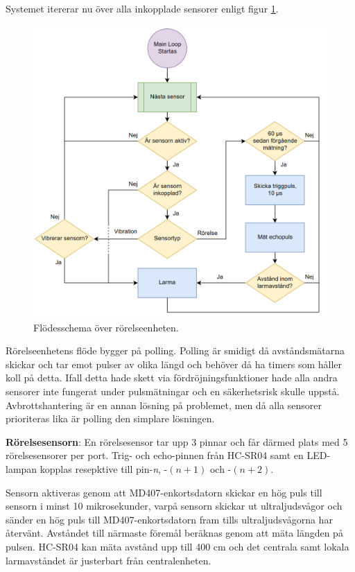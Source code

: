 \documentclass{article}
\begin{document}
\begin{flushleft}
Systemet itererar nu över alla inkopplade sensorer enligt figur \ref{fig:MotionFlow}. \linebreak \newline
\end{flushleft}

\begin{figure}
\centering
\includegraphics[scale=0.3]{figurer/FlowchartMotion.png}
\caption{Flödesschema över rörelseenheten.}
 \label{fig:MotionFlow}
\end{figure}

Rörelseenhetens flöde bygger på polling. Polling är smidigt då avståndsmätarna skickar och tar emot pulser av olika längd
och behöver då ha timers som håller koll på detta. Ifall detta hade skett via fördröjningsfunktioner hade alla andra sensorer
inte fungerat under pulsmätningar och en säkerhetsrisk skulle uppstå. Avbrottshantering är en annan lösning på problemet,
men då alla sensorer prioriteras lika är polling den simplare lösningen.


\textbf{Rörelsesensorn}:
En rörelsesensor tar upp 3 pinnar och får därmed plats med 5 rörelsesensorer per port.
Trig- och echo-pinnen från HC-SR04 samt en LED-lampan kopplas resepktive till  pin-\textit{n}, -$(n+1)$ och -$(n+2)$.


Sensorn aktiveras genom att MD407-enkortsdatorn skickar en hög puls till sensorn i minst 10 mikrosekunder,
varpå sensorn skickar ut ultraljudsvågor och sänder en hög puls till MD407-enkortsdatorn fram tills ultraljudsvågorna har återvänt. Avståndet till närmaste föremål beräknas genom att mäta längden på pulsen.
HC-SR04 kan mäta avstånd upp till 400 cm och det centrala samt lokala larmavståndet är justerbart från centralenheten.
\end{document}
